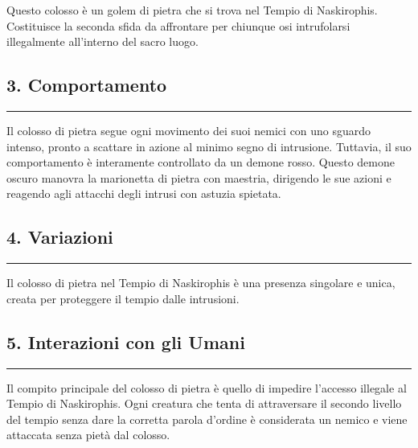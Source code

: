 Questo colosso è un golem di pietra che si trova nel Tempio di
Naskirophis. Costituisce la seconda sfida da affrontare per chiunque osi
intrufolarsi illegalmente all'interno del sacro luogo.

\subsection{3. Comportamento}\label{comportamento}

\begin{center}\rule{0.5\linewidth}{0.5pt}\end{center}

Il colosso di pietra segue ogni movimento dei suoi nemici con uno
sguardo intenso, pronto a scattare in azione al minimo segno di
intrusione. Tuttavia, il suo comportamento è interamente controllato da
un demone rosso. Questo demone oscuro manovra la marionetta di pietra
con maestria, dirigendo le sue azioni e reagendo agli attacchi degli
intrusi con astuzia spietata.

\subsection{4. Variazioni}\label{variazioni}

\begin{center}\rule{0.5\linewidth}{0.5pt}\end{center}

Il colosso di pietra nel Tempio di Naskirophis è una presenza singolare
e unica, creata per proteggere il tempio dalle intrusioni.

\subsection{5. Interazioni con gli
Umani}\label{interazioni-con-gli-umani}

\begin{center}\rule{0.5\linewidth}{0.5pt}\end{center}

Il compito principale del colosso di pietra è quello di impedire
l'accesso illegale al Tempio di Naskirophis. Ogni creatura che tenta di
attraversare il secondo livello del tempio senza dare la corretta parola
d'ordine è considerata un nemico e viene attaccata senza pietà dal
colosso.
